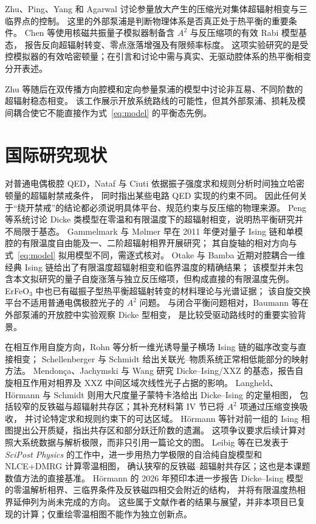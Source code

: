 \documentclass[UTF8,11pt,a4paper]{ctexart}
\begin{document}
Zhu、Ping、Yang 和 Agarwal 讨论参量放大产生的压缩光对集体超辐射相变与三临界点的控制\cite{Zhu2020SqueezedLight}。
这里的外部泵浦是判断物理体系是否真正处于热平衡的重要条件。
Chen 等使用核磁共振量子模拟器制备含 $A^2$ 与反压缩项的有效 Rabi 模型基态，
报告反向超辐射转变、零点涨落增强及有限频率标度\cite{Chen2021Antisqueezing}。
这项实验研究的是受控模拟器的有效哈密顿量；在引言和讨论中需与真实、无驱动腔体系的热平衡相变分开表述。

Zhu 等随后在双传播方向腔模和定向参量泵浦的模型中讨论非互易、不同阶数的超辐射稳态相变\cite{Zhu2024Nonreciprocal}。
该工作展示开放系统路线的可能性，但其外部泵浦、损耗及模间耦合使它不能直接作为式~\eqref{eq:model} 的平衡态先例。

\section{国际研究现状}

对普通电偶极腔 QED，Nataf 与 Ciuti 依据振子强度求和规则分析时间独立哈密顿量的超辐射禁戒条件，
同时指出某些电路 QED 实现的约束不同\cite{Nataf2010NoGo}。
因此任何关于“绕开禁戒”的结论都必须说明具体平台、规范约束与反压缩的物理来源。
Peng 等系统讨论 Dicke 类模型在零温和有限温度下的超辐射相变，说明热平衡研究并不局限于基态\cite{Peng2019Unified}。
Gammelmark 与 Mølmer 早在 2011 年便对量子 Ising 链和单模腔的有限温度自由能及一、二阶超辐射相界开展研究；
其自旋轴的相对方向与式~\eqref{eq:model} 拟用模型不同，需逐式核对\cite{Gammelmark2011Thermal}。
Otake 与 Bamba 近期对腔耦合一维经典 Ising 链给出了有限温度超辐射相变和临界温度的精确结果；
该模型并未包含本文拟研究的量子自旋涨落与独立反压缩项，但构成直接的有限温度先例\cite{Otake2026FiniteT}。
ErFeO$_3$ 中也已有磁振子型热平衡超辐射转变的材料理论与光谱证据；
该自旋交换平台不适用普通电偶极腔光子的 $A^2$ 问题\cite{Bamba2022Magnonic,Kim2025Magnonic}。
与闭合平衡问题相对，Baumann 等在外部泵浦的开放腔中实验观察 Dicke 型相变，
是比较受驱动路线时的重要实验背景\cite{Baumann2010OpenDicke}。

在相互作用自旋方向，Rohn 等分析一维光诱导量子横场 Ising 链的磁序改变与直接相变\cite{Rohn2020QuantizedIsing}；
Schellenberger 与 Schmidt 给出关联光--物质系统正常相低能部分的映射方法\cite{Schellenberger2024Mapping}。
Mendonça、Jachymski 与 Wang 研究 Dicke--Ising/XXZ 的基态，报告自旋相互作用对相界及
XXZ 中间区域次线性光子占据的影响\cite{Mendonca2025Matter}。
Langheld、Hörmann 与 Schmidt 则用大尺度量子蒙特卡洛给出 Dicke--Ising 的定量相图，
包括较窄的反铁磁与超辐射共存区；其补充材料第 IV 节已将 $A^2$ 项通过压缩变换吸收，
并讨论特定求和规则约束下的可达区域\cite{Langheld2025Wormhole}。
Hörmann 等针对前一组的 Ising 相图提出公开质疑，指出共存区和部分跃迁阶数的遗漏\cite{Hormann2025Comment}。
这项争议要求后续计算对照大系统数据与解析极限，而非只引用一篇论文的图。
Leibig 等在已发表于 \emph{SciPost Physics} 的工作中，进一步用热力学极限的自洽纯自旋模型和 NLCE+DMRG 计算零温相图，
确认狭窄的反铁磁--超辐射共存区；这也是本课题数值方法的直接基准\cite{Leibig2026SelfConsistent}。
Hörmann 的 2026 年预印本进一步报告 Dicke--Ising 模型的零温解析相界、三临界条件及反铁磁四相交会附近的结构，
并将有限温度热相界延伸列为尚未完成的方向\cite{Hormann2026Folds}。
这些属于文献作者的结果与展望，并非本项目已复现的计算；仅重绘零温相图不能作为独立创新点。
\end{document}
